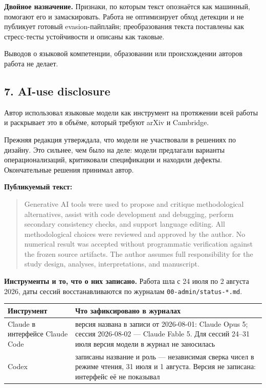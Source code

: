 \documentclass[11pt,a4paper]{article}
\renewcommand{\_}{\textunderscore\allowbreak}
\begin{document}
\textbf{Двойное назначение.} Признаки, по которым текст опознаётся как машинный,
помогают его и замаскировать. Работа не оптимизирует обход детекции и не публикует
готовый evasion-пайплайн; преобразования текста поставлены как стресс-тесты
устойчивости и описаны как таковые.

Выводов о языковой компетенции, образовании или происхождении авторов работа не
делает.

\subsection{7. AI-use disclosure}

Автор использовал языковые модели как инструмент на протяжении всей работы и
раскрывает это в объёме, который требуют arXiv и Cambridge.

Прежняя редакция утверждала, что модели не участвовали в решениях по дизайну. Это
сильнее, чем было на деле: модели предлагали варианты операционализаций, критиковали
спецификации и находили дефекты. Окончательные решения принимал автор.

\textbf{Публикуемый текст:}

\begin{quote}
Generative AI tools were used to propose and critique methodological alternatives,
assist with code development and debugging, perform secondary consistency checks,
and support language editing. All methodological choices were reviewed and
approved by the author. No numerical result was accepted without programmatic
verification against the frozen source artifacts. The author assumes full
responsibility for the study design, analyses, interpretations, and manuscript.
\end{quote}

\textbf{Инструменты и то, что о них записано.} Работа шла с 24 июля по 2 августа 2026,
даты сессий восстанавливаются по журналам \texttt{00-\allowbreak{}admin/status-\allowbreak{}*.md}.

\begin{center}
\small
\begin{tabularx}{\textwidth}{lX}
\toprule
Инструмент & Что зафиксировано в журналах \\
\midrule
Claude в интерфейсе Claude Code & версия названа в записи от 2026-08-01: Claude Opus 5; сессия 2026-08-02 — Claude Fable 5. Для сессий 24–31 июля версия модели в журнал не заносилась \\
Codex & записаны название и роль — независимая сверка чисел в режиме чтения, 31 июля и 1 августа. Версия не записана: интерфейс её не показывал \\
\bottomrule
\end{tabularx}
\end{center}
\end{document}

